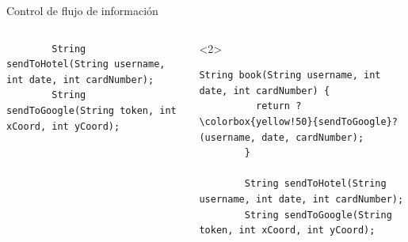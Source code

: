 \documentclass[aspectratio=169,10pt]{beamer}
\begin{document}
\begin{frame}[fragile]{Control de flujo de información}
\begin{columns}[T,onlytextwidth]
\begin{onlyenv}
\begin{lstlisting}
        String sendToHotel(String username, int date, int cardNumber);
        String sendToGoogle(String token, int xCoord, int yCoord);
      \end{lstlisting}
    \end{onlyenv}
    \begin{onlyenv}<2>
      \begin{lstlisting}[escapechar=?]
        String book(String username, int date, int cardNumber) {
          return ?\colorbox{yellow!50}{sendToGoogle}?(username, date, cardNumber);
        }

        String sendToHotel(String username, int date, int cardNumber);
        String sendToGoogle(String token, int xCoord, int yCoord);
      \end{lstlisting}
    \end{onlyenv}

  \end{columns}
\end{frame}
\end{document}
